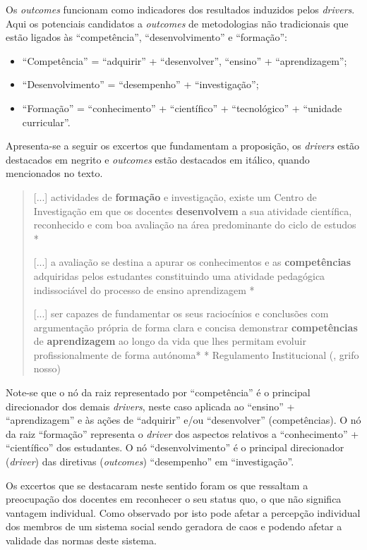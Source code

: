 \documentclass{textolivre-html}
\begin{document}
Os \textit{outcomes} funcionam como indicadores dos resultados induzidos pelos \textit{drivers}. Aqui os potenciais candidatos a \textit{outcomes} de metodologias não tradicionais que estão ligados às “competência”, “desenvolvimento” e “formação”:

\begin{itemize}
\item “Competência” = “adquirir” + “desenvolver”, “ensino” + “aprendizagem”;
\item “Desenvolvimento” = “desempenho” + “investigação”;
\item “Formação” = “conhecimento” + “científico” + “tecnológico” + “unidade curricular”.
\end{itemize}

Apresenta-se a seguir os excertos que fundamentam a proposição, os \textit{drivers} estão destacados em negrito e \textit{outcomes} estão destacados em itálico, quando mencionados no texto.

\begin{quote}
[...] actividades de \textbf{formação} e investigação, existe um Centro de Investigação em que os docentes \textbf{desenvolvem} a sua atividade científica, reconhecido e com boa avaliação na área predominante do ciclo de estudos *

[...] a avaliação se destina a apurar os conhecimentos e as \textbf{competências} adquiridas pelos estudantes constituindo uma atividade pedagógica indissociável do processo de ensino aprendizagem *

[...] ser capazes de fundamentar os seus raciocínios e conclusões com argumentação própria de forma clara e concisa demonstrar \textbf{competências} de \textbf{aprendizagem} ao longo da vida que lhes permitam evoluir profissionalmente de forma autónoma* 		
	* Regulamento Institucional (\cite{utad2018}, grifo nosso)
\end{quote}

Note-se que o nó da raiz representado por “competência” é o principal direcionador dos demais \textit{drivers}, neste caso aplicada ao “ensino” + “aprendizagem” e às ações de “adquirir” e/ou “desenvolver” (competências). O nó da raiz “formação” representa o \textit{driver} dos aspectos relativos a “conhecimento” + “científico” dos estudantes. O nó “desenvolvimento” é o principal direcionador (\textit{driver}) das diretivas (\textit{outcomes}) “desempenho” em “investigação”.

Os excertos que se destacaram neste sentido foram os que ressaltam a preocupação dos docentes em reconhecer o seu status quo, o que não significa vantagem individual. Como observado por \textcite{rogers1983} isto pode afetar a percepção individual dos membros de um sistema social sendo geradora de caos e podendo afetar a validade das normas deste sistema.
\end{document}
